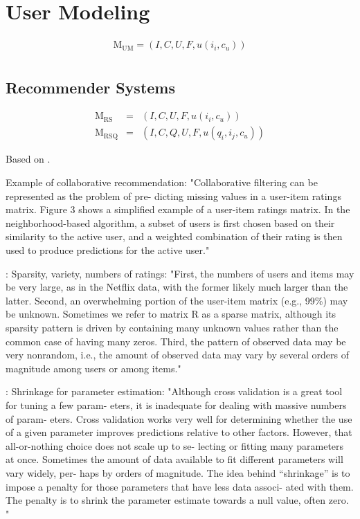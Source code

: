 \section{User Modeling}

\begin{eqnarray}
  \mathrm{M_{UM}} = (I, C, U, F, u(i_i, c_u))\\
\end{eqnarray}

\subsection{Recommender Systems}

\begin{eqnarray}
  \mathrm{M_{RS}}   &=& (I, C, U, F,    u(i_i, c_u))\\
  \mathrm{M_{RSQ}}  &=& (I, C, Q, U, F, u(q_i, i_j, c_u))
\end{eqnarray}

Based on \cite[p2]{Adomavicius2005}.


\cite[p5]{Sugiyama2004} Example of collaborative recommendation: 
"Collaborative filtering can be represented as the problem of pre- dicting missing values in a user-item ratings matrix. Figure 3 shows a simplified example of a user-item ratings matrix.
In the neighborhood-based algorithm, a subset of users is first chosen based on their similarity to the active user, and a weighted combination of their rating is then used to produce predictions for the active user."

\cite[p2]{Bell2007b}: Sparsity, variety, numbers of ratings:
"First, the numbers of users and items may be very large, as in the Netflix data, with the former likely much larger than the latter.
Second, an overwhelming portion of the user-item matrix (e.g., 99\%) may be unknown. Sometimes we refer to matrix R as a sparse matrix, although its sparsity pattern is driven by containing many unknown values rather than the common case of having many zeros.
Third, the pattern of observed data may be very nonrandom, i.e., the amount of observed data may vary by several orders of magnitude among users or among items."

\cite[p2]{Bell2007b}: Shrinkage for parameter estimation:
"Although cross validation is a great tool for tuning a few param- eters, it is inadequate for dealing with massive numbers of param- eters. Cross validation works very well for determining whether the use of a given parameter improves predictions relative to other factors. However, that all-or-nothing choice does not scale up to se- lecting or fitting many parameters at once. Sometimes the amount of data available to fit different parameters will vary widely, per- haps by orders of magnitude. The idea behind “shrinkage” is to impose a penalty for those parameters that have less data associ- ated with them. The penalty is to shrink the parameter estimate towards a null value, often zero. "



